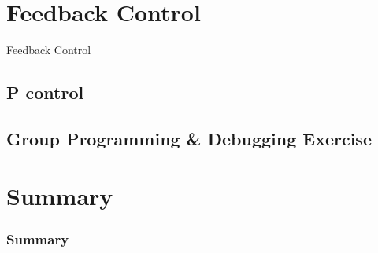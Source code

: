 \documentclass{beamer}
\begin{document}

\section{Feedback Control} %
\begin{frame}
\centering \huge Feedback Control
\end{frame}

\subsection{P control}

\subsection{Group Programming & Debugging Exercise}

\section{Summary} %

\begin{frame}
\frametitle{Summary}

\end{frame}
\end{document}
